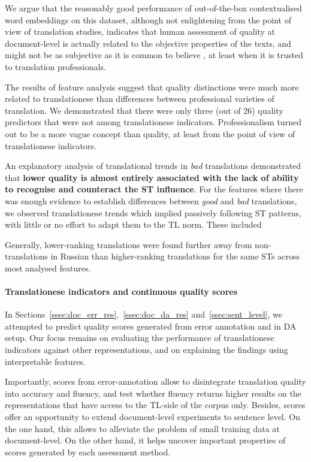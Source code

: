 We argue that the reasonably good performance of out-of-the-box contextualised word embeddings on this dataset, although not enlightening from the point of view of translation studies, indicates that human assessment of quality at document-level is actually related to the objective properties of the texts, and might not be as subjective as it is common to believe , at least when it is trusted to translation professionals. 

The results of feature analysis suggest that quality distinctions were much more related to translationese than differences between professional varieties of translation. 
We demonstrated that there were only three (out of 26) quality predictors that were not among translationese indicators. Professionalism turned out to be a more vague concept than quality, at least from the point of view of translationese indicators.

An explanatory analysis of translational trends in \textit{bad} translations demonstrated that \textbf{lower quality is almost entirely associated with the lack of ability to recognise and counteract the ST influence}. For the features where there was enough evidence to establish differences between \textit{good} and \textit{bad} translations, we observed translationese trends which implied passively following ST patterns, with little or no effort to adapt them to the TL norm. These included 
 
Generally, lower-ranking translations were found further away from non-translations in Russian than higher-ranking translations for the same STs across most analysed features.  
\paragraph{Translationese indicators and continuous quality scores}
In Sections~\ref{ssec:doc_err_res},~\ref{ssec:doc_da_res} and~\ref{ssec:sent_level}, we attempted to predict quality scores generated from error annotation and in DA setup. Our focus remains on evaluating the performance of translationese indicators against other representations, and on explaining the findings using interpretable features.

Importantly, scores from error-annotation allow to disintegrate translation quality into accuracy and fluency, and test whether fluency returns higher results on the representations that have access to the TL-side of the corpus only. 
Besides, scores offer an opportunity to extend document-level experiments to sentence level. On the one hand, this allows to alleviate the problem of small training data at document-level. On the other hand, it helps uncover important properties of scores generated by each assessment method.

